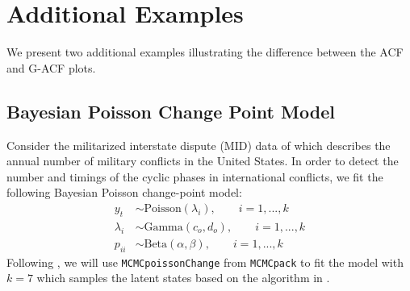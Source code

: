 \documentclass[11pt]{article}
\theoremstyle{remark}
\begin{document}
\section{Additional Examples}
We present two additional examples illustrating the difference between the ACF and G-ACF plots.
\subsection{Bayesian Poisson Change Point Model}


Consider the militarized interstate dispute (MID) data of \cite{martin2011mcmcpack} which describes the annual number of military conflicts in the United States. In order to detect the number and timings of the cyclic phases in international conflicts, we fit the following Bayesian Poisson change-point model:
%
\begin{align*}
    y_t &\sim \text{Poisson}(\lambda_i), \qquad i = 1, ..., k\\
    \lambda_i &\sim \text{Gamma}(c_o, d_o), \qquad i = 1,..., k\\
    p_{ii} &\sim \text{Beta}(\alpha, \beta), \qquad i = 1,..., k
\end{align*}
Following \cite{martin2011mcmcpack}, we will use \texttt{MCMCpoissonChange} from \texttt{MCMCpack} to fit the model with $k = 7$ which samples the latent states based on the algorithm in \cite{chib1998estimation}. 
\end{document}
